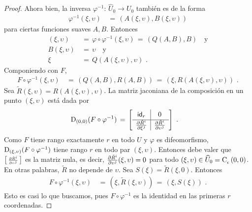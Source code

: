 \begin{proof}
	Ahora bien, la inversa $\varphi^{-1}:\,%
	\widehat{U}_{0}\rightarrow U_{0}$ tambi\'{e}n es de la forma
	\begin{align*}
		\varphi^{-1}(\xi,\upsilon) & \,=\,
			(A(\xi,\upsilon),B(\xi,\upsilon))
	\end{align*}
	para ciertas funciones suaves $A,B$. Entonces
	\begin{align*}
		(\xi,\upsilon) & \,=\,\varphi\circ\varphi^{-1}(\xi,\upsilon)
			\,=\,(Q(A,B),B) \quad\text{y} \\
		B(\xi,\upsilon) & \,=\,\upsilon\quad\text{y} \\
		\xi & \,=\,Q(A(\xi,\upsilon),\upsilon)
		\text{ .}
	\end{align*}
	Componiendo con $F$,
	\begin{align*}
		F\circ\varphi^{-1}(\xi,\upsilon) & \,=\,(Q(A,B),R(A,B))
			\,=\,(\xi,R(A(\xi,\upsilon),\upsilon))
		\text{ .}
	\end{align*}
	Sea $\tilde{R}(\xi,\upsilon)=R(A(\xi,\upsilon),\upsilon)$. La matriz
	jaconiana de la composici\'{o}n en un punto $(\xi,\upsilon)$ est\'{a}
	dada por
	\begin{align*}
		\jacobiana[(0,0)]{(F\circ\varphi^{-1})} & \,=\,
		\sbox0{$\id[r]$}
		\sbox1{$\derivada{\tilde{R}^{i}}{\xi^{j}}$}
		\left[
		\begin{array}{c|c}
			\vphantom{\usebox{1}}\usebox{0} &
			\makebox[\wd0]{$0$} \\
			\hline
			\usebox{1} &
			\makebox{$\derivada{\tilde{R}^{i}}{\upsilon^{j}}$}
		\end{array}
		\right]
		\text{ .}
	\end{align*}
	Como $F$ tiene rango exactamente $r$ en todo $U$ y $\varphi$ es
	difeomorfismo, $\jacobiana[(\xi,\upsilon)]{(F\circ\varphi^{-1})}$
	tiene rango $r$ en todo par $(\xi,\upsilon)$. Entonces debe valer
	que
	\begin{math}
		\left[\begin{smallmatrix}
			\derivada{\tilde{R}^{i}}{\upsilon^{j}}
		\end{smallmatrix}\right]
	\end{math}
	es la matriz nula, es decir,
	$\derivada{\tilde{R}^{i}}{\upsilon^{j}}(\xi,\upsilon)=0$ para todo
	$(\xi,\upsilon)\in\widehat{U}_{0}=\cubo{\epsilon}{0,0}$. En otras
	palabras, $\tilde{R}$ no depende de $\upsilon$. Sea
	$S(\xi)=\tilde{R}(\xi,0)$. Entonces
	\begin{align*}
		F\circ\varphi^{-1}(\xi,\upsilon) & \,=\,
			(\xi,\tilde{R}(\xi,\upsilon)) \,=\,
			(\xi,S(\xi))
		\text{ .}
	\end{align*}
	Esto es casi lo que buscamos, pues $F\circ\varphi^{-1}$ es la
	identidad en las primeras $r$ coordenadas.


\end{proof}
